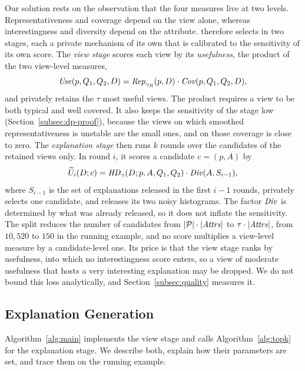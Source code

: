 Our solution rests on the observation that the four measures live at two levels.
Representativeness and coverage depend on the view alone, whereas interestingness and diversity depend on the attribute.
\sys{} therefore selects in two stages, each a private mechanism of its own that is calibrated to the sensitivity of its own score.
The \emph{view stage} scores each view by its \emph{usefulness}, the product of the two view-level measures,
\begin{equation}
\mathit{Use}(p,Q_1,Q_2,D)= \mathit{Rep}_{\gamma_R}(p,D)\cdot \mathit{Cov}(p,Q_1,Q_2,D),
\label{eq:usefulness-proxy}
\end{equation}
and privately retains the $\tau$ most useful views.
The product requires a view to be both typical and well covered.
It also keeps the sensitivity of the stage low (Section~\ref{subsec:dp-proof}), because the views on which smoothed representativeness is unstable are the small ones, and on those coverage is close to zero.
The \emph{explanation stage} then runs $k$ rounds over the candidates of the retained views only.
In round $i$, it scores a candidate $c=(p,A)$ by
\begin{equation}
\widetilde{U}_i(D;c)=\mathit{HD}_{\gamma}(D;p,A,Q_1,Q_2)\cdot \mathit{Div}(A,S_{i-1}),
\label{eq:selection-utility}
\end{equation}
where $S_{i-1}$ is the set of explanations released in the first $i-1$ rounds, privately selects one candidate, and releases its two noisy histograms.
The factor $\mathit{Div}$ is determined by what was already released, so it does not inflate the sensitivity.
The split reduces the number of candidates from $|\mathcal{P}|\cdot|\mathit{Attrs}|$ to $\tau\cdot|\mathit{Attrs}|$, from $10{,}520$ to $150$ in the running example, and no score multiplies a view-level measure by a candidate-level one.
Its price is that the view stage ranks by usefulness, into which no interestingness score enters, so a view of moderate usefulness that hosts a very interesting explanation may be dropped.
We do not bound this loss analytically, and Section~\ref{subsec:quality} measures it.

\subsection{Explanation Generation}
\label{subsec:explanation-generation}

Algorithm~\ref{alg:main} implements the view stage and calls Algorithm~\ref{alg:topk} for the explanation stage.
We describe both, explain how their parameters are set, and trace them on the running example.

